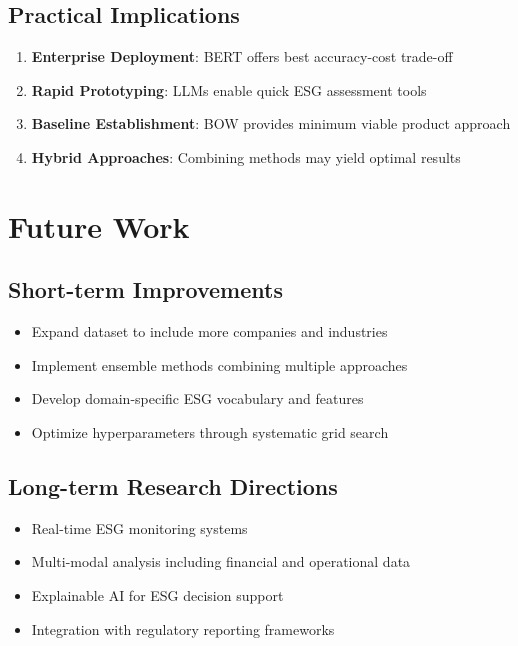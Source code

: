 \documentclass[12pt,a4paper]{article}
\begin{document}
\subsection{Practical Implications}

\begin{enumerate}
    \item \textbf{Enterprise Deployment}: BERT offers best accuracy-cost trade-off
    \item \textbf{Rapid Prototyping}: LLMs enable quick ESG assessment tools
    \item \textbf{Baseline Establishment}: BOW provides minimum viable product approach
    \item \textbf{Hybrid Approaches}: Combining methods may yield optimal results
\end{enumerate}

\section{Future Work}

\subsection{Short-term Improvements}
\begin{itemize}
    \item Expand dataset to include more companies and industries
    \item Implement ensemble methods combining multiple approaches
    \item Develop domain-specific ESG vocabulary and features
    \item Optimize hyperparameters through systematic grid search
\end{itemize}

\subsection{Long-term Research Directions}
\begin{itemize}
    \item Real-time ESG monitoring systems
    \item Multi-modal analysis including financial and operational data
    \item Explainable AI for ESG decision support
    \item Integration with regulatory reporting frameworks
\end{itemize}
\end{document}
